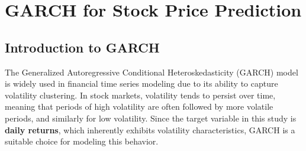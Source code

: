 


\newpage
\section{GARCH for Stock Price Prediction}

\subsection{Introduction to GARCH}

The Generalized Autoregressive Conditional Heteroskedasticity (GARCH) \cite{BOLLERSLEV1986307} model is widely used in financial time series modeling due to its ability to capture volatility clustering. In stock markets, volatility tends to persist over time, meaning that periods of high volatility are often followed by more volatile periods, and similarly for low volatility. Since the target variable in this study is \textbf{daily returns}, which inherently exhibits volatility characteristics, GARCH is a suitable choice for modeling this behavior.

